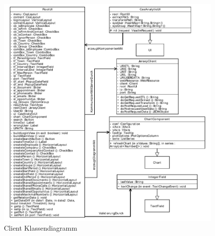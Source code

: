 \begin{figure}[htbp]
\begin{center}
\includegraphics[width=1.0\textwidth]{pics/ClientKlassendiagramm.pdf}
\caption{Client Klassendiagramm}
\label{umsetzung_klassendiagramm_client}
\end{center}
\end{figure}